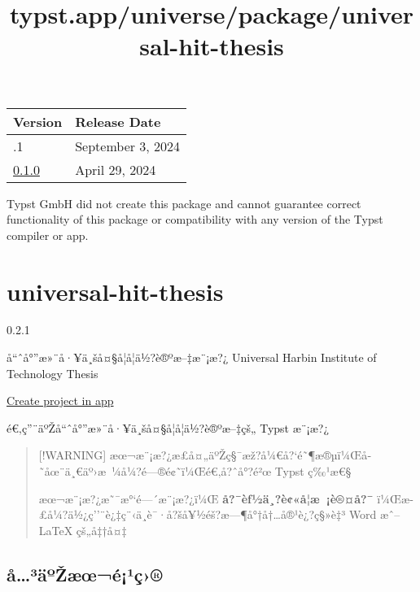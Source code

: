 \begin{longtable}[]{@{}ll@{}}
\toprule\noalign{}
Version & Release Date \\
\midrule\noalign{}
\endhead
\bottomrule\noalign{}
\endlastfoot
0.1.1 & September 3, 2024 \\
\href{https://typst.app/universe/package/acrotastic/0.1.0/}{0.1.0} &
April 29, 2024 \\
\end{longtable}

Typst GmbH did not create this package and cannot guarantee correct
functionality of this package or compatibility with any version of the
Typst compiler or app.


\title{typst.app/universe/package/universal-hit-thesis}

\label{banner}
\label{template-thumbnail}

\section{universal-hit-thesis}\label{universal-hit-thesis}

{ 0.2.1 }

å``ˆå°''æ»¨å·¥ä¸šå¤§å­¦å­¦ä½?è®ºæ--‡æ¨¡æ?¿ \textbar{} Universal Harbin
Institute of Technology Thesis

\href{/app?template=universal-hit-thesis&version=0.2.1}{Create project
in app}

\label{readme}
é€‚ç''¨äºŽå``ˆå°''æ»¨å·¥ä¸šå¤§å­¦å­¦ä½?è®ºæ--‡çš„ Typst æ¨¡æ?¿


\begin{quote}
{[}!WARNING{]}
æœ¬æ¨¡æ?¿æ­£å¤„äºŽç§¯æž?å¼€å?{}`é˜¶æ®µï¼Œå­˜åœ¨ä¸€äº›æ~¼å¼?é---®é¢˜ï¼Œé€‚å?ˆå°?é²œ
Typst ç‰¹æ€§

æœ¬æ¨¡æ?¿æ˜¯æ°`é---´æ¨¡æ?¿ï¼Œ \textbf{å?¯èƒ½ä¸?è¢«å­¦æ~¡è®¤å?¯}
ï¼Œæ­£å¼?ä½¿ç''¨è¿‡ç¨‹ä¸­è¯·å?šå¥½éš?æ---¶å°†å†\ldots å®¹è¿?ç§»è‡³ Word
æˆ-- LaTeX çš„å‡†å¤‡
\end{quote}

\subsection{å\ldots³äºŽæœ¬é¡¹ç›®}\label{uxe5uxb3uxe4uxbaux17euxe6ux153uxe9uxb9uxe7}

